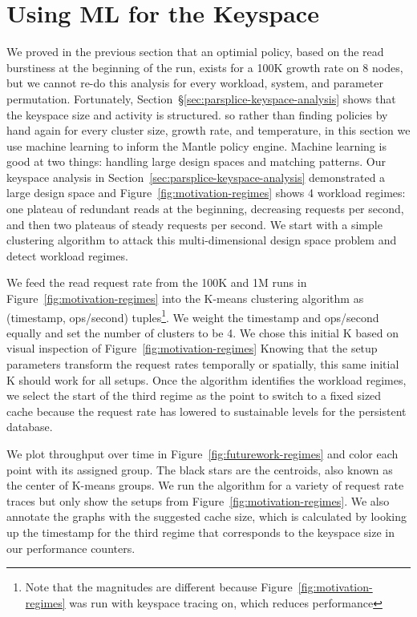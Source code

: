 \section{Using ML for the Keyspace}
\label{sec:ml-for-the-keyspace}

We proved in the previous section that an optimial policy, based on the read
burstiness at the beginning of the run,  exists for a 100K growth rate on 8
nodes, but we cannot re-do this analysis for every workload, system, and
parameter permutation.  Fortunately,
Section~\S\ref{sec:parsplice-keyspace-analysis} shows that the keyspace size
and activity is structured. so rather than finding policies by hand again for
every cluster size, growth rate, and temperature, in this section we use
machine learning to inform the Mantle policy engine.  Machine learning is good
at two things: handling large design spaces and matching patterns. Our keyspace
analysis in Section~\ref{sec:parsplice-keyspace-analysis} demonstrated a large
design space and Figure~\ref{fig:motivation-regimes} shows 4 workload regimes:
one plateau of redundant reads at the beginning, decreasing requests per
second, and then two plateaus of steady requests per second. We start with a
simple clustering algorithm to attack this multi-dimensional design space
problem and detect workload regimes.

We feed the read request rate from the 100K and 1M runs in
Figure~\ref{fig:motivation-regimes} into the K-means clustering algorithm as
(timestamp, ops/second) tuples\footnote{Note that the magnitudes are different
because Figure~\ref{fig:motivation-regimes} was run with keyspace tracing on,
which reduces performance}. We weight the timestamp and ops/second equally and
set the number of clusters to be 4.  We chose this initial K  based on visual
inspection of Figure~\ref{fig:motivation-regimes} Knowing that the setup
parameters transform the request rates temporally or spatially, this same
initial K should work for all setups. Once the algorithm identifies the
workload regimes, we select the start of the third regime as the point to
switch to a fixed sized cache because the request rate has lowered to
sustainable levels for the persistent database.

We plot throughput over time in Figure~\ref{fig:futurework-regimes} and
color each point with its assigned group. The black stars are the centroids,
also known as the center of K-means groups.  We run the algorithm for a variety
of request rate traces but only show the setups from
Figure~\ref{fig:motivation-regimes}. We also annotate the graphs with the
suggested cache size, which is calculated by looking up the timestamp for the
third regime that corresponds to the keyspace size in our performance counters.

